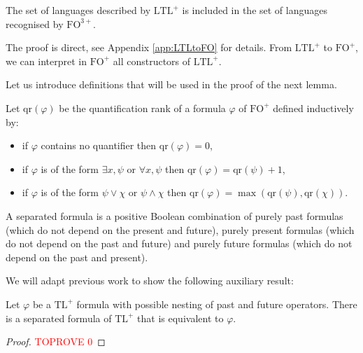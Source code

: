 \documentclass[a4paper,UKenglish,cleveref, autoref, thm-restate]{lipics-v2021}
\newcommand{\FO}{\mathrm{FO}}
\newcommand{\FOp}{\FO^+}
\newcommand{\FOthp}{\FO^{3+}}
\newcommand{\LTL}{\mathrm{LTL}}
\newcommand{\LTLp}{\LTL^+}
\newcommand{\TL}{\mathrm{TL}}
\newcommand{\TLp}{\TL^+}
\newcommand{\qr}{\mathrm{qr}}
\begin{document}
\begin{lemma}\label{LTLtoFO}
    The set of languages described by $\LTLp$ is included in the set of languages recognised by $\FOthp$.\end{lemma}


The proof is direct, see Appendix \ref{app:LTLtoFO} for details. From $\LTLp$ to $\FOp$, we can interpret in $\FOp$ all constructors of $\LTLp$.












Let us introduce definitions that will be used in the proof of the next lemma.

\begin{definition}
    Let $\qr(\varphi)$ be the quantification rank of a formula $\varphi$ of $\FOp$ defined inductively by:
    \begin{itemize}
        \item if $\varphi$ contains no quantifier then $\qr(\varphi) = 0$,
        \item if $\varphi$ is of the form $\exists x, \psi$ or $\forall x, \psi$ then $\qr(\varphi) = \qr(\psi) + 1$,
        \item if $\varphi$ is of the form $\psi \lor \chi$ or $\psi \land \chi$ then $\qr(\varphi) = \max(\qr(\psi),\qr(\chi))$.
    \end{itemize}
\end{definition}

\begin{definition}
    A separated formula is a positive Boolean combination of purely past formulas (which do not depend on the present and future), purely present formulas (which do not depend on the past and future) and purely future formulas (which do not depend on the past and present).
\end{definition}

We will adapt previous work to show the following auxiliary result:

\begin{lemma}\label{lem:separation}
    Let $\varphi$ be a $\TLp$ formula with possible nesting of past and future operators. There is a separated formula of $\TLp$ that is equivalent to $\varphi$.
\end{lemma}


\begin{proof}\textcolor{red}{TOPROVE 0}\end{proof}
\end{document}
